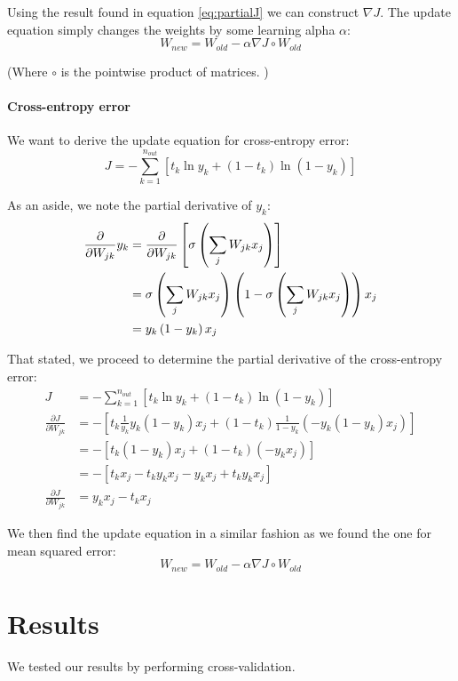 \documentclass[11pt]{article}
\begin{document}
Using the result found in equation  \eqref{eq:partialJ} we can construct $\nabla J$. The update equation simply changes the weights by some learning alpha $\alpha$:
\[
	W_{new} = W_{old} - \alpha \nabla J \circ W_{old}
\]  

(Where $\circ$ is the pointwise product of matrices. )

\paragraph{Cross-entropy error} We want to derive the update equation for cross-entropy error:
\[
	J = - \sum_{k=1}^{n_{out}}\left[t_k \ln y_k + \left(1- t_k \right)\ln \left( 1- y_k \right) \right]
\]

As an aside, we note the partial derivative of $y_k$:
\begin{align}
\frac{\partial}{\partial W_{jk}} y_k &= \frac{\partial}{\partial W_{jk}} \left[ \sigma \left( \sum_j W_{jk} x_j\right) \right] \\ 
&= \sigma \left( \sum_j W_{jk} x_j\right) \left( 1 - \sigma \left( \sum_j W_{jk} x_j\right) \right) x_j \\
&= y_k \left( 1 - y_k \right) x_j
\end{align}

That stated, we proceed to determine the partial derivative of the cross-entropy error:
\begin{align}
J &= - \sum_{k=1}^{n_{out}}\left[t_k \ln y_k + \left(1- t_k \right)\ln \left( 1- y_k \right) \right] \\
\frac{\partial J}{\partial W_{jk}} &= 
- \left[ t_k \frac{1}{y_k} y_k \left( 1 - y_k \right) x_j + \left( 1 - t_k \right) \frac{1}{1 - y_k} \left( - y_k \left( 1 - y_k \right) x_j \right) \right] \\
&= - \left[ t_k \left( 1 - y_k \right) x_j + \left( 1 - t_k \right) \left( -y_k x_j \right) \right] \\
&= - \left[ t_k x_j - t_k y_k x_j - y_k x _j + t_k y_k x_j \right] \\
\frac{\partial J}{\partial W_{jk}} &= y_k x_j - t_k x_j
\end{align}

We then find the update equation in a similar fashion as we found the one for mean squared error:
\[
	W_{new} = W_{old} - \alpha \nabla J \circ W_{old}
\]  
\section{Results}

We tested our results by performing cross-validation. \\
\end{document}
